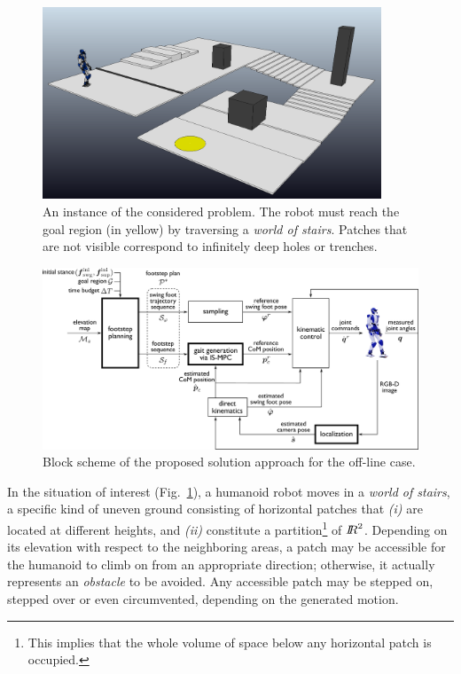 \begin{figure}
\centering
\includegraphics[width=0.9\textwidth]{figures/WoS_Scenario.PNG}
\caption{An instance of the considered problem. The robot must reach the goal region (in yellow) by traversing a {\em world of stairs}. Patches that are not visible correspond to infinitely deep holes or trenches.}
\label{fig:WoS:WoSScenario}
\end{figure}

\begin{figure}
\centering
\includegraphics[width=\textwidth]{figures/BlockSchemeOffline.pdf}
\caption{Block scheme of the proposed solution approach for the off-line case.}
\label{fig:WoS:blockScheme1}
\end{figure}

In the situation of interest (Fig.~\ref{fig:WoS:WoSScenario}), a humanoid robot moves in a {\em world of stairs}, a specific kind of uneven ground consisting of horizontal patches that {\em (i)} are located at different heights, and {\em (ii)} constitute a partition\footnote{This implies that the whole volume of space below any horizontal patch is occupied.} of ${I\!\!R}^2$. 
Depending on its elevation with respect to the neighboring areas, a patch may be accessible for the humanoid to climb on from an appropriate direction; otherwise, it actually represents an {\em obstacle} to be avoided. Any accessible patch may be stepped on, stepped over or even circumvented, depending on the generated motion.  

